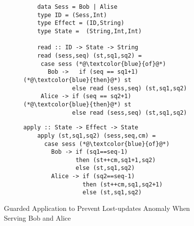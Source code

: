 \begin{figure}[t]
	\centering
	\begin{subfigure}[t]{0.53\textwidth}
	\begin{lstlisting}
	data Sess = Bob | Alise
	type ID = (Sess,Int) 
	type Effect = (ID,String)
 	type State =  (String,Int,Int)
	
	read :: ID -> State -> String
	read (sess,seq) (st,sq1,sq2) = 
 	 case sess (*@\textcolor{blue}{of}@*) 
	   Bob ->   if (seq == sq1+1) (*@\textcolor{blue}{then}@*) st
              else read (sess,seq) (st,sq1,sq2)
     Alice -> if (seq == sq2+1) (*@\textcolor{blue}{then}@*) st
              else read (sess,seq) (st,sq1,sq2)
	\end{lstlisting}		  
	\end{subfigure}
	\hfill
	\begin{subfigure}[t]{0.42\textwidth}
	\begin{lstlisting}[firstnumber=13]
	apply :: State -> Effect -> State 
	apply (st,sq1,sq2) (sess,seq,cm) = 
	  case sess (*@\textcolor{blue}{of}@*) 
	    Bob -> if (sq1==seq-1)
	           then (st++cm,sq1+1,sq2)
	           else (st,sq1,sq2)
	    Alice -> if (sq2==seq-1)
	             then (st++cm,sq1,sq2+1)
	             else (st,sq1,sq2)
	\end{lstlisting}		  
        \end{subfigure}

	\hrulefill
	\caption{Guarded Application to Prevent Lost-updates Anomaly
	When Serving Bob and Alice}
	\label{fig:modified_code}
\end{figure}


